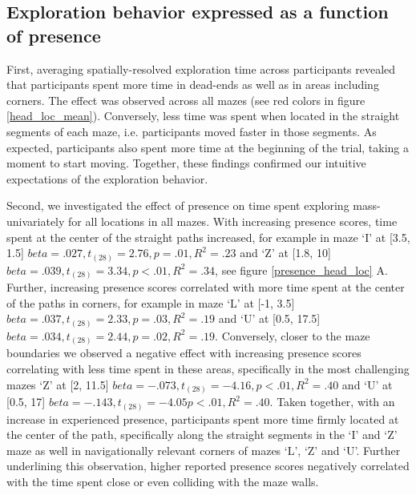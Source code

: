 \subsection{Exploration behavior expressed as a function of presence} 
First, averaging spatially-resolved exploration time across participants revealed that participants spent more time in dead-ends as well as in areas including corners. The effect was observed across all mazes (see red colors in figure \ref{head_loc_mean}). Conversely, less time was spent when located in the straight segments of each maze, i.e. participants moved faster in those segments. As expected, participants also spent more time at the beginning of the trial, taking a moment to start moving. Together, these findings confirmed our intuitive expectations of the exploration behavior. 

Second, we investigated the effect of presence on time spent exploring mass-univariately for all locations in all mazes. With increasing presence scores, time spent at the center of the straight paths increased, for example in maze `I' at [3.5, 1.5] $beta=.027, t_{(28)}=2.76, p=.01, R^2=.23$ and `Z' at [1.8, 10] $beta=.039, t_{(28)}=3.34, p<.01, R^2=.34$, see figure \ref{presence_head_loc} A. Further, increasing presence scores correlated with more time spent at the center of the paths in corners, for example in maze `L' at [-1, 3.5] $beta=.037, t_{(28)}=2.33, p=.03, R^2=.19$ and `U' at [0.5, 17.5] $beta=.034, t_{(28)}=2.44, p=.02, R^2=.19$. Conversely, closer to the maze boundaries we observed a negative effect with increasing presence scores correlating with less time spent in these areas, specifically in the most challenging mazes `Z' at [2, 11.5] $beta=-.073, t_{(28)}=-4.16, p<.01, R^2=.40$ and `U' at [0.5, 17] $beta=-.143, t_{(28)}=-4.05 p<.01, R^2=.40$. Taken together, with an increase in experienced presence, participants spent more time firmly located at the center of the path, specifically along the straight segments in the `I' and `Z' maze as well in navigationally relevant corners of mazes `L', `Z' and `U'. Further underlining this observation, higher reported presence scores negatively correlated with the time spent close or even colliding with the maze walls.
